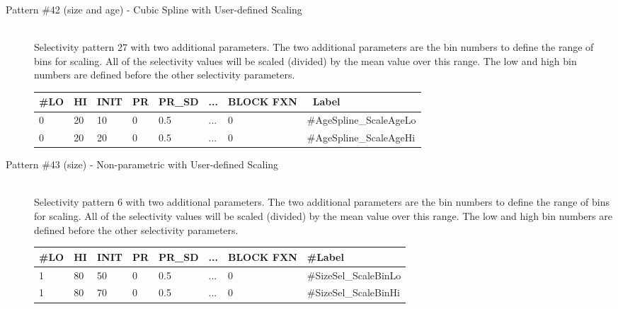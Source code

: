 \begin{description}
	\item[Pattern \#42 (size and age) - Cubic Spline with User-defined Scaling]\hfil\\
	Selectivity pattern 27 with two additional parameters. The two additional parameters are the bin numbers to define the range of bins for scaling. All of the selectivity values will be scaled (divided) by the mean value over this range. The low and high bin numbers are defined before the other selectivity parameters.

	\begin{center}
		\begin{longtable}{p{0.8cm} p{0.8cm} p{1cm} p{0.8cm} p{1.75cm}p{1cm} p{1.2cm} p{5.2cm}}
		\hline
		\#LO & HI & INIT & PR & PR\_SD & ... & BLOCK FXN & \ Label \\
		\hline
		0 & 20 & 10 & 0 & 0.5 &  ... & 0 & \#AgeSpline\_ScaleAgeLo \\
		0 & 20 & 20 & 0 & 0.5 & ... & 0 & \#AgeSpline\_ScaleAgeHi \\
		\hline
		\end{longtable}
	\end{center}
\end{description}

\begin{description}
	\item[Pattern \#43 (size) - Non-parametric with User-defined Scaling]\hfil\\
	Selectivity pattern 6 with two additional parameters. The two additional parameters are the bin numbers to define the range of bins for scaling. All of the selectivity values will be scaled (divided) by the mean value over this range. The low and high bin numbers are defined before the other selectivity parameters.
	\pagebreak
	\begin{center}
		\begin{longtable}{p{0.8cm} p{0.8cm} p{1cm} p{0.8cm} p{1.75cm}p{1cm} p{1.2cm} p{5.2cm}}
			\hline
			\#LO & HI & INIT & PR & PR\_SD  & ... & BLOCK FXN & \#Label \\
			\hline
			1 & 80 & 50 & 0 & 0.5  & ... & 0 & \#SizeSel\_ScaleBinLo \\
			1 & 80 & 70 & 0 & 0.5  & ... & 0 & \#SizeSel\_ScaleBinHi \\
			\hline
		\end{longtable}
	\end{center}
\end{description}


